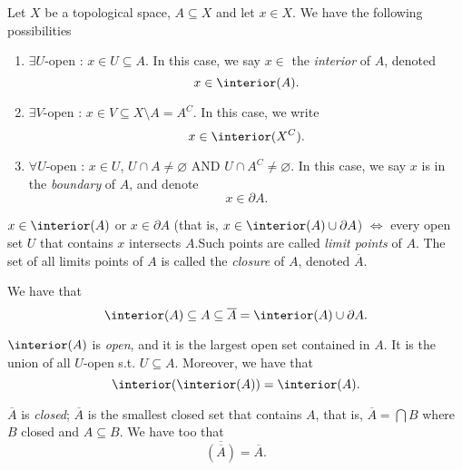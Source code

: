 \begin{definition}
Let $X$ be a topological space, $A \subseteq X$ and let $x \in X$. We have the following possibilities
\begin{enumerate}
    \item $\exists U$-open : $x \in U \subseteq A$. In this case, we say $x \in $ the \emph{interior} of $A$, denoted \[
    x \in \interior (A).
    \]
    \item $\exists V$-open : $x \in V \subseteq X\setminus A = A^C$. In this case, we write \[
    x \in \interior (X^C).    
    \]
    \item $\forall U$-open : $x \in U$, $U \cap A \neq \varnothing$ AND $U \cap A^C \neq \varnothing$. In this case, we say $x$ is in the \emph{boundary} of $A$, and denote \[
    x \in \partial A.    
    \]
\end{enumerate}
\end{definition}

\begin{definition}[Closure]
    $x \in \interior (A)$ or $x \in \partial A$ (that is, $x \in \interior (A) \cup \partial A$) $\iff $ every open set $U$ that contains $x$ intersects $A$.\footnotemark Such points are called \emph{limit points} of $A$. The set of all limits points of $A$ is called the \emph{closure} of $A$, denoted \(
    \overline{A}.
    \)
\end{definition}


\begin{remark}
    We have that $$\interior (A) \subseteq A \subseteq \overline{A} = \interior (A) \cup \partial A.$$
\end{remark}

\begin{proposition}
    $\interior (A)$ is \emph{open}, and it is the largest open set contained in $A$. It is the union of all $U$-open s.t. $U \subseteq A$. Moreover, we have that $$\interior(\interior(A)) = \interior(A).$$
\end{proposition}

\begin{proposition}
    $\overline{A}$ is \emph{closed}; $\overline{A}$ is the smallest closed set that contains $A$, that is, $\overline{A} = \bigcap B$ where $B$ closed and $A \subseteq B$. We have too that \[
    \overline{(\overline{A})} = \overline{A}.    
    \]
\end{proposition}

